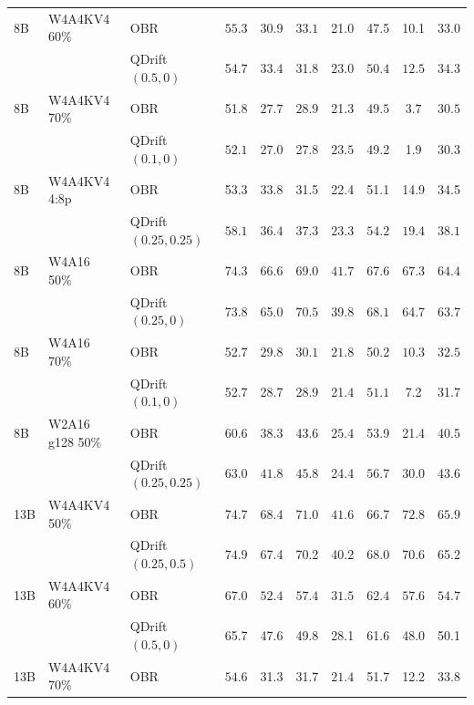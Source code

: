 \begin{tabular}{lllccccccc}
8B & W4A4KV4 60\% & OBR & $\mathbf{55.3}$ & 30.9 & $\mathbf{33.1}$ & 21.0 & 47.5 & 10.1 & 33.0 \\
 &  & QDrift $(0.5, 0)$ & 54.7 & $\mathbf{33.4}$ & 31.8 & $\mathbf{23.0}$ & $\mathbf{50.4}$ & $\mathbf{12.5}$ & $\mathbf{34.3}$ \\
8B & W4A4KV4 70\% & OBR & 51.8 & $\mathbf{27.7}$ & $\mathbf{28.9}$ & 21.3 & $\mathbf{49.5}$ & $\mathbf{3.7}$ & $\mathbf{30.5}$ \\
 &  & QDrift $(0.1, 0)$ & $\mathbf{52.1}$ & 27.0 & 27.8 & $\mathbf{23.5}$ & 49.2 & 1.9 & 30.3 \\
8B & W4A4KV4 4:8p & OBR & 53.3 & 33.8 & 31.5 & 22.4 & 51.1 & 14.9 & 34.5 \\
 &  & QDrift $(0.25, 0.25)$ & $\mathbf{58.1}$ & $\mathbf{36.4}$ & $\mathbf{37.3}$ & $\mathbf{23.3}$ & $\mathbf{54.2}$ & $\mathbf{19.4}$ & $\mathbf{38.1}$ \\
8B & W4A16 50\% & OBR & $\mathbf{74.3}$ & $\mathbf{66.6}$ & 69.0 & $\mathbf{41.7}$ & 67.6 & $\mathbf{67.3}$ & $\mathbf{64.4}$ \\
 &  & QDrift $(0.25, 0)$ & 73.8 & 65.0 & $\mathbf{70.5}$ & 39.8 & $\mathbf{68.1}$ & 64.7 & 63.7 \\
8B & W4A16 70\% & OBR & 52.7 & $\mathbf{29.8}$ & $\mathbf{30.1}$ & $\mathbf{21.8}$ & 50.2 & $\mathbf{10.3}$ & $\mathbf{32.5}$ \\
 &  & QDrift $(0.1, 0)$ & 52.7 & 28.7 & 28.9 & 21.4 & $\mathbf{51.1}$ & 7.2 & 31.7 \\
8B & W2A16 g128 50\% & OBR & 60.6 & 38.3 & 43.6 & $\mathbf{25.4}$ & 53.9 & 21.4 & 40.5 \\
 &  & QDrift $(0.25, 0.25)$ & $\mathbf{63.0}$ & $\mathbf{41.8}$ & $\mathbf{45.8}$ & 24.4 & $\mathbf{56.7}$ & $\mathbf{30.0}$ & $\mathbf{43.6}$ \\
\midrule
13B & W4A4KV4 50\% & OBR & 74.7 & $\mathbf{68.4}$ & $\mathbf{71.0}$ & $\mathbf{41.6}$ & 66.7 & $\mathbf{72.8}$ & $\mathbf{65.9}$ \\
 &  & QDrift $(0.25, 0.5)$ & $\mathbf{74.9}$ & 67.4 & 70.2 & 40.2 & $\mathbf{68.0}$ & 70.6 & 65.2 \\
13B & W4A4KV4 60\% & OBR & $\mathbf{67.0}$ & $\mathbf{52.4}$ & $\mathbf{57.4}$ & $\mathbf{31.5}$ & $\mathbf{62.4}$ & $\mathbf{57.6}$ & $\mathbf{54.7}$ \\
 &  & QDrift $(0.5, 0)$ & 65.7 & 47.6 & 49.8 & 28.1 & 61.6 & 48.0 & 50.1 \\
13B & W4A4KV4 70\% & OBR & $\mathbf{54.6}$ & 31.3 & 31.7 & $\mathbf{21.4}$ & 51.7 & 12.2 & 33.8 \\

\end{tabular}
